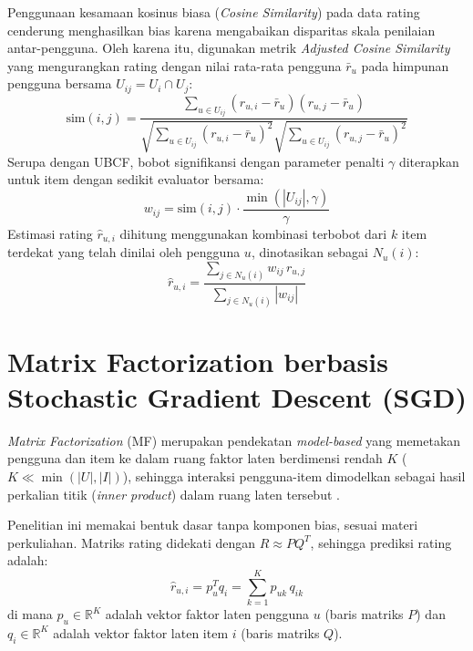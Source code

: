 Penggunaan kesamaan kosinus biasa (\textit{Cosine Similarity}) pada data rating cenderung menghasilkan bias karena mengabaikan disparitas skala penilaian antar-pengguna. Oleh karena itu, digunakan metrik \textit{Adjusted Cosine Similarity} yang mengurangkan rating dengan nilai rata-rata pengguna $\bar{r}_u$ pada himpunan pengguna bersama $U_{ij} = U_i \cap U_j$:
\begin{equation}
\label{eq:adj_cos}
\text{sim}(i, j) = \frac{\sum_{u \in U_{ij}} (r_{u,i} - \bar{r}_u)(r_{u,j} - \bar{r}_u)}{\sqrt{\sum_{u \in U_{ij}} (r_{u,i} - \bar{r}_u)^2} \sqrt{\sum_{u \in U_{ij}} (r_{u,j} - \bar{r}_u)^2}}
\end{equation}
Serupa dengan UBCF, bobot signifikansi dengan parameter penalti $\gamma$ diterapkan untuk item dengan sedikit evaluator bersama:
\begin{equation}
\label{eq:sig_weight_i}
w_{ij} = \text{sim}(i, j) \cdot \frac{\min(|U_{ij}|, \gamma)}{\gamma}
\end{equation}
Estimasi rating $\hat{r}_{u,i}$ dihitung menggunakan kombinasi terbobot dari $k$ item terdekat yang telah dinilai oleh pengguna $u$, dinotasikan sebagai $N_u(i)$:
\begin{equation}
\label{eq:ibcf_pred}
\hat{r}_{u,i} = \frac{\sum_{j \in N_u(i)} w_{ij} \, r_{u,j}}{\sum_{j \in N_u(i)} |w_{ij}|}
\end{equation}

\section{Matrix Factorization berbasis Stochastic Gradient Descent (SGD)}
\textit{Matrix Factorization} (MF) merupakan pendekatan \textit{model-based} yang memetakan pengguna dan item ke dalam ruang faktor laten berdimensi rendah $K$ ($K \ll \min(|U|, |I|)$), sehingga interaksi pengguna-item dimodelkan sebagai hasil perkalian titik (\textit{inner product}) dalam ruang laten tersebut \citep{koren2009matrix}.

Penelitian ini memakai bentuk dasar tanpa komponen bias, sesuai materi perkuliahan. Matriks rating didekati dengan $R \approx P Q^T$, sehingga prediksi rating adalah:
\begin{equation}
\label{eq:mf_pred}
\hat{r}_{u,i} = p_u^T q_i = \sum_{k=1}^{K} p_{uk}\, q_{ik}
\end{equation}
di mana $p_u \in \mathbb{R}^K$ adalah vektor faktor laten pengguna $u$ (baris matriks $P$) dan $q_i \in \mathbb{R}^K$ adalah vektor faktor laten item $i$ (baris matriks $Q$).

